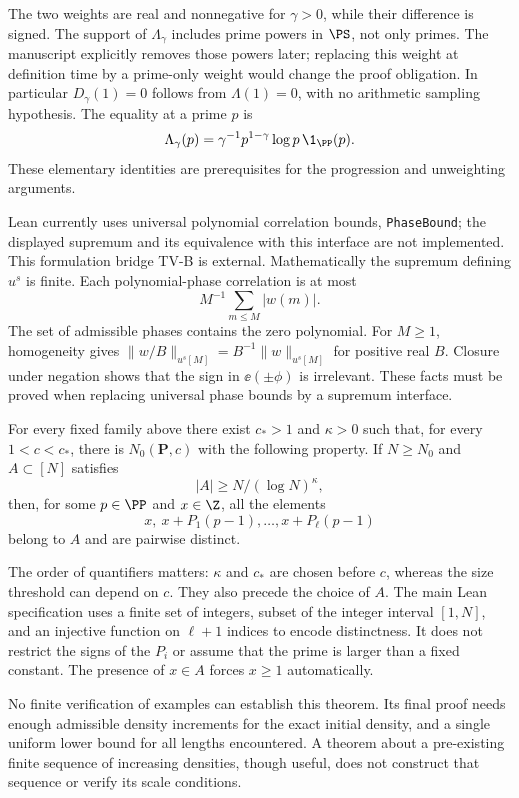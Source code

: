 The two weights are real and nonnegative for $\gamma>0$, while their difference is signed. The support of $\Lambda_\gamma$ includes prime powers in $\PS$, not only primes. The manuscript explicitly removes those powers later; replacing this weight at definition time by a prime-only weight would change the proof obligation. In particular $D_\gamma(1)=0$ follows from $\Lambda(1)=0$, with no arithmetic sampling hypothesis. The equality at a prime $p$ is
\[
 \Lambda_\gamma(p)=\gamma^{-1}p^{1-\gamma}\log p\,\1_{\PP}(p).
\]
These elementary identities are prerequisites for the progression and unweighting arguments.

Lean currently uses universal polynomial correlation bounds, \texttt{PhaseBound}; the displayed supremum and its equivalence with this interface are not implemented. This formulation bridge TV-B is external. Mathematically the supremum defining $u^s$ is finite. Each polynomial-phase correlation is at most
\[M^{-1}\sum_{m\leq M}|w(m)|.\] The set of admissible phases contains the zero polynomial. For $M\geq1$, homogeneity gives $\|w/B\|_{u^s[M]}=B^{-1}\|w\|_{u^s[M]}$ for positive real $B$. Closure under negation shows that the sign in $\ee(\pm\phi)$ is irrelevant. These facts must be proved when replacing universal phase bounds by a supremum interface.
\fi

\begin{theorem}\label{t:szemeredi}
For every fixed family above there exist $c_*>1$ and $\kappa>0$ such that, for every $1<c<c_*$, there is $N_0(\mathbf P,c)$ with the following property. If $N\geq N_0$ and $A\subset[N]$ satisfies
\[
 |A|\geq N/(\log N)^\kappa,
\]
then, for some $p\in\PP$ and $x\in\Z$, all the elements
\[
 x,\ x+P_1(p-1),\ldots,x+P_\ell(p-1)
\]
belong to $A$ and are pairwise distinct.
\end{theorem}
\ifDetailed
The order of quantifiers matters: $\kappa$ and $c_*$ are chosen before $c$, whereas the size threshold can depend on $c$. They also precede the choice of $A$. The main Lean specification uses a finite set of integers, subset of the integer interval $[1,N]$, and an injective function on $\ell+1$ indices to encode distinctness. It does not restrict the signs of the $P_i$ or assume that the prime is larger than a fixed constant. The presence of $x\in A$ forces $x\geq1$ automatically.

No finite verification of examples can establish this theorem. Its final proof needs enough admissible density increments for the exact initial density, and a single uniform lower bound for all lengths encountered. A theorem about a pre-existing finite sequence of increasing densities, though useful, does not construct that sequence or verify its scale conditions.
\fi

